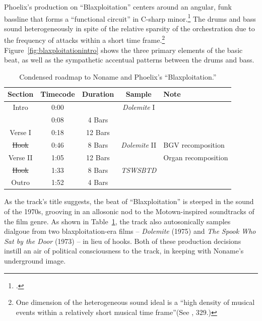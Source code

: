 Phoelix's production on ``Blaxploitation'' centers around an angular, funk bassline that forms a ``functional circuit'' in C-sharp minor.\footnote{\cite{kyleadamsHarmonicSyntacticMotivic2020}.} The drums and bass sound heterogeneously in spite of the relative sparsity of the orchestration due to the frequency of attacks within a short time frame.\footnote{One dimension of the heterogeneous sound ideal is a ``high density of musical events within a relatively short musical time frame''(See \cite{ollywilsonHeterogeneousSoundIdeal1992}, 329.)} Figure~\ref{fig:blaxploitationintro} shows the three primary elements of the basic beat, as well as the sympathetic accentual patterns between the drums and bass.

\begin{table}[ht]
    \centering
    \begin{tabular}{|c|c|c|c|l|}
         \hline
        Section     & Timecode & Duration    & Sample               & Note \\ \hline
        Intro       & 0:00     &             & \textit{Dolemite} I  & \\ \hline
                    & 0:08     & 4 Bars      &                      & \\ \hline
        Verse I     & 0:18     & 12 Bars     &                      & \\ \hline
        \sout{Hook} & 0:46     & 8 Bars      & \textit{Dolemite} II & BGV recomposition \\ \hline
        Verse II    & 1:05     & 12 Bars     &                      & Organ recomposition \\ \hline
        \sout{Hook} & 1:33     & 8 Bars      & \textit{TSWSBTD}     & \\ \hline
        Outro       & 1:52     & 4 Bars      &                      & \\ \hline
    \end{tabular}
    \caption{Condensed roadmap to Noname and Phoelix's ``Blaxploitation.''}
    \label{tab:blaxploitation}
\end{table}

As the track's title suggests, the beat of ``Blaxploitation'' is steeped in the sound of the 1970s, grooving in an allosonic nod to the Motown-inspired soundtracks of the film genre. As shown in Table~\ref{tab:blaxploitation}, the track also autosonically samples dialgoue from two blaxploitation-era films – \textit{Dolemite} (1975) and \textit{The Spook Who Sat by the Door} (1973) – in lieu of hooks. Both of these production decisions instill an air of political consciousness to the track, in keeping with Noname's underground image. 

